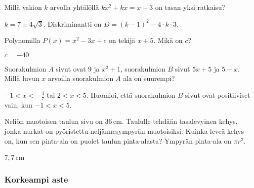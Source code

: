 \begin{multicols}{2}
\begin{tehtava} 
Millä vakion $k$ arvolla yhtälöllä $kx^2+kx=x-3$ on tasan yksi ratkaisu?
    \begin{vastaus}
		$k = 7 \pm 4 \sqrt{3}$. Diskriminantti on $D = (k-1)^2-4\cdot k \cdot 3$.
    \end{vastaus}
\end{tehtava}

\begin{tehtava} 
Polynomilla $P(x)=x^2-3x+c$ on tekijä $x+5$. Mikä on $c$?
    \begin{vastaus}
		$c=-40$
    \end{vastaus}
\end{tehtava}

\begin{tehtava} 
Suorakulmion $A$ sivut ovat $9$ ja $x^2+1$, suorakulmion $B$ sivut $5x+5$
ja $5-x$. Millä luvun $x$ arvoilla suorakulmion $A$ ala on suurempi?
    \begin{vastaus}
	$-1 < x < -\frac{4}{7}$ tai $2 < x < 5$. Huomioi, että suorakulmion $B$
    sivut ovat positiiviset vain, kun $-1<x<5$.
    \end{vastaus}
\end{tehtava}

\begin{tehtava} %
Neliön muotoisen taulun sivu on $36$\,cm. Taululle tehdään tasalevyinen kehys, jonka nurkat on pyöristettu neljännesympyrän muotoisiksi. Kuinka leveä kehys on, kun sen pinta-ala on puolet taulun pinta-alasta? Ympyrän pinta-ala on $\pi r^2$.
    \begin{vastaus}
     $7,7$\,cm
    \end{vastaus}
\end{tehtava}

\end{multicols}

\subsubsection*{Korkeampi aste}

